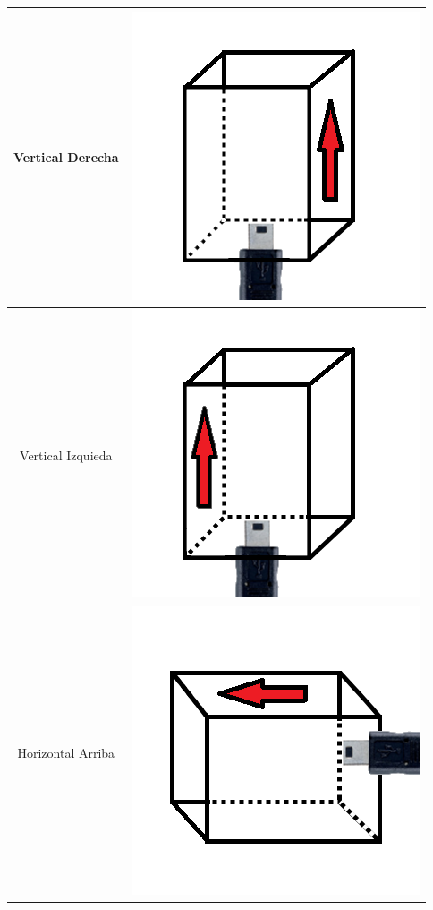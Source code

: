 \documentclass[12pt,a4paper]{article}
\begin{document}
\begin{table}[H]
\begin{tabular}{|c|c|}
		\hline 
		Vertical Derecha  &  \includegraphics[scale=0.2]{images/IMU/verticalderecha}  \\ 
		\hline 
		Vertical Izquieda & \includegraphics[scale=0.2]{images/IMU/verticalizquierda}   \\ 
		\hline 
		Horizontal Arriba &  \includegraphics[scale=0.2]{images/IMU/horizontalarriba}   \\ 

\end{tabular}
\end{table}
\end{document}
